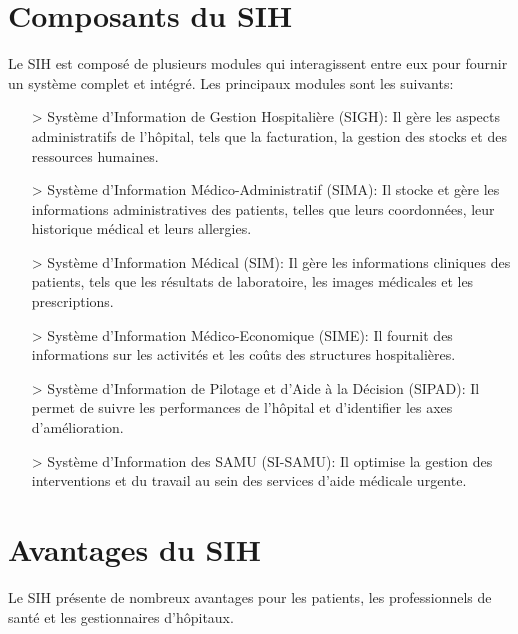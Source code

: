 \documentclass[12pt]{rapportINPTCLOUD}
\begin{document}
	\section{Composants du SIH}
	
	Le SIH est composé de plusieurs modules qui interagissent entre eux pour fournir un système complet et intégré. Les principaux modules sont les suivants:
	
	\begin{itemize}
		\item[>] 	Système d'Information de Gestion Hospitalière (SIGH): Il gère les aspects administratifs de l'hôpital, tels que la facturation, la gestion des stocks et des ressources humaines.
		\item[>] 	Système d'Information Médico-Administratif (SIMA): Il stocke et gère les informations administratives des patients, telles que leurs coordonnées, leur historique médical et leurs allergies.
		\item[>] 	Système d'Information Médical (SIM): Il gère les informations cliniques des patients, tels que les résultats de laboratoire, les images médicales et les prescriptions.
		\item[>] 	Système d'Information Médico-Economique (SIME): Il fournit des informations sur les activités et les coûts des structures hospitalières.
		\item[>] 	Système d'Information de Pilotage et d'Aide à la Décision (SIPAD): Il permet de suivre les performances de l'hôpital et d'identifier les axes d'amélioration.
		\item[>] 	Système d'Information des SAMU (SI-SAMU): Il optimise la gestion des interventions et du travail au sein des services d'aide médicale urgente.
	\end{itemize}
	
	
	\section{Avantages du SIH}
	
	Le SIH présente de nombreux avantages pour les patients, les professionnels de santé et les gestionnaires d'hôpitaux.
	
\end{document}
